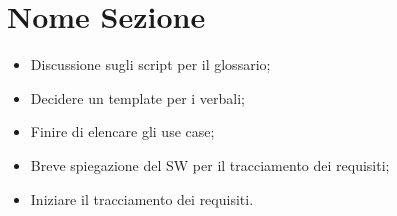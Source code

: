 \documentclass[../template.tex]{subfiles}
\begin{document}
\section{Nome Sezione}
\begin{itemize}
	\item Discussione sugli script per il glossario;
	\item Decidere un template per i verbali;
	\item Finire di elencare gli use case;
	\item Breve spiegazione del SW per il tracciamento dei requisiti;
	\item Iniziare il tracciamento dei requisiti.
\end{itemize}
\end{document}
